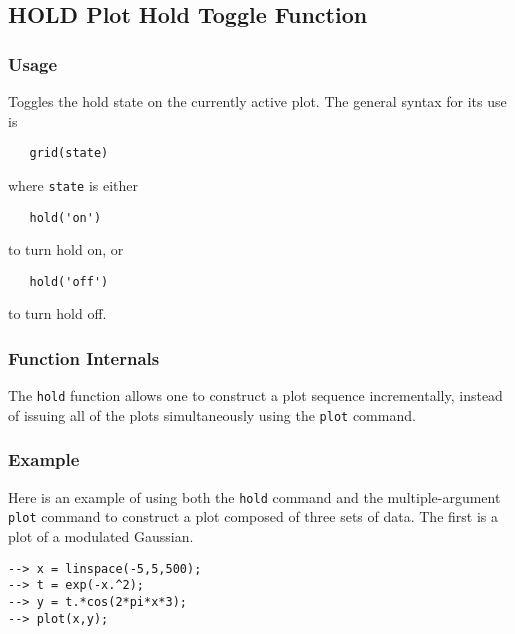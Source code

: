 %
%
%
\subsection{HOLD Plot Hold Toggle Function}
\subsubsection{Usage}
Toggles the hold state on the currently active plot.  The
general syntax for its use is
\begin{verbatim}
   grid(state)
\end{verbatim}
where \verb|state| is either
\begin{verbatim}
   hold('on')
\end{verbatim}
to turn hold on, or
\begin{verbatim}
   hold('off')
\end{verbatim}
to turn hold off.
\subsubsection{Function Internals}
The \verb|hold| function allows one to construct a plot sequence
incrementally, instead of issuing all of the plots simultaneously
using the \verb|plot| command.
\subsubsection{Example}
Here is an example of using both the \verb|hold| command and the
multiple-argument \verb|plot| command to construct a plot composed
of three sets of data.  The first is a plot of a modulated Gaussian.
\begin{verbatim}
--> x = linspace(-5,5,500);
--> t = exp(-x.^2);
--> y = t.*cos(2*pi*x*3);
--> plot(x,y);
\end{verbatim}

